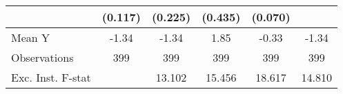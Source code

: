 {\begin{tabular}{l*{5}{c}}
            &     (0.117)         &     (0.225)         &     (0.435)         &     (0.070)         &                     \\
\midrule
Mean Y      &       -1.34         &       -1.34         &        1.85         &       -0.33         &       -1.34         \\
Observations&         399         &         399         &         399         &         399         &         399         \\
Exc. Inst. F-stat&                     &      13.102         &      15.456         &      18.617         &      14.810         \\
\bottomrule
\end{tabular}
}
